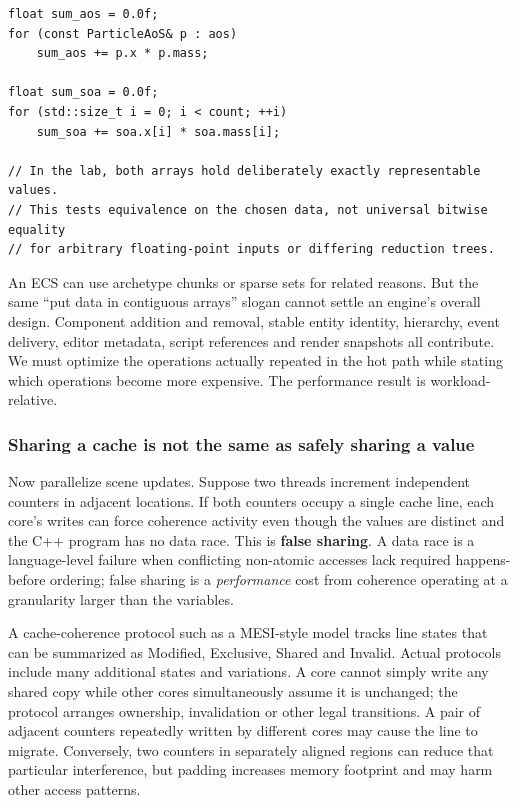 \begin{verbatim}
float sum_aos = 0.0f;
for (const ParticleAoS& p : aos)
    sum_aos += p.x * p.mass;

float sum_soa = 0.0f;
for (std::size_t i = 0; i < count; ++i)
    sum_soa += soa.x[i] * soa.mass[i];

// In the lab, both arrays hold deliberately exactly representable values.
// This tests equivalence on the chosen data, not universal bitwise equality
// for arbitrary floating-point inputs or differing reduction trees.
\end{verbatim}

An ECS can use archetype chunks or sparse sets for related reasons. But the same ``put data in contiguous arrays'' slogan cannot settle an engine's overall design. Component addition and removal, stable entity identity, hierarchy, event delivery, editor metadata, script references and render snapshots all contribute. We must optimize the operations actually repeated in the hot path while stating which operations become more expensive. The performance result is workload-relative.

\subsubsection{Sharing a cache is not the same as safely sharing a value}\label{sharing-a-cache-is-not-the-same-as-safely-sharing-a-value}

Now parallelize scene updates. Suppose two threads increment independent counters in adjacent locations. If both counters occupy a single cache line, each core's writes can force coherence activity even though the values are distinct and the C++ program has no data race. This is \textbf{false sharing}. A data race is a language-level failure when conflicting non-atomic accesses lack required happens-before ordering; false sharing is a \emph{performance} cost from coherence operating at a granularity larger than the variables.

A cache-coherence protocol such as a MESI-style model tracks line states that can be summarized as Modified, Exclusive, Shared and Invalid. Actual protocols include many additional states and variations. A core cannot simply write any shared copy while other cores simultaneously assume it is unchanged; the protocol arranges ownership, invalidation or other legal transitions. A pair of adjacent counters repeatedly written by different cores may cause the line to migrate. Conversely, two counters in separately aligned regions can reduce that particular interference, but padding increases memory footprint and may harm other access patterns.

